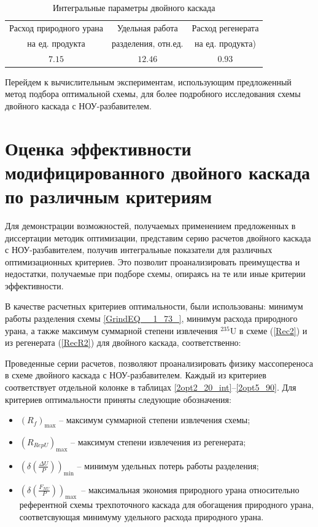 \begin{table}
\begin{tabular}{|c|c|c|}
    \hline Расход природного урана & Удельная работа & Расход регенерата \\
           на ед. продукта & разделения, отн.ед. & на ед. продукта) \\
    \hline $7.15$ & $12.46$ & $0.93$ \\
    \hline
\end{tabular}
\caption{Интегральные параметры двойного каскада}\label{MDKparams}
\end{table}


Перейдем к вычислительным экспериментам, использующим предложенный метод подбора оптимальной схемы, для более подробного исследования схемы двойного каскада с НОУ-разбавителем.

\section{Оценка эффективности модифицированного двойного каскада по различным критериям}

Для демонстрации возможностей, получаемых применением предложенных в диссертации методик оптимизации, представим серию расчетов двойного каскада с НОУ-разбавителем, получив интегральные показатели для различных оптимизационных критериев. Это позволит проанализировать преимущества и недостатки, получаемые при подборе схемы, опираясь на те или иные критерии эффективности.

В качестве расчетных критериев оптимальности, были использованы: минимум работы разделения схемы \ref{GrindEQ__1_73_}, минимум расхода природного урана, а также максимум суммарной степени извлечения $^{235}$U в схеме (\ref{Rec2}) и из регенерата (\ref{RecR2}) для двойного каскада, соответственно:

Проведенные серии расчетов, позволяют проанализировать физику массопереноса в схеме двойного каскада с НОУ-разбавителем. Каждый из критериев соответствует отдельной колонке в таблицах \ref{2opt2_20_int}--\ref{2opt5_90}. Для критериев оптимальности приняты следующие обозначения:

\begin{itemize}
    \item $(R_f)_\text{max}$ -- максимум суммарной степени извлечения схемы;
    \item $(R_{RepU})_\text{max}$ -- максимум степени извлечения из регенерата;
    \item $(\delta(\frac{\Delta U}{P}))_\text{min}$ -- минимум удельных потерь работы разделения; 
    \item $(\delta(\frac{F_{NU}}{P}))_\text{max}$\ -- максимальная экономия природного урана относительно референтной схемы трехпоточного каскада для обогащения природного урана, соответсвующая минимуму удельного расхода природного урана.
\end{itemize}

